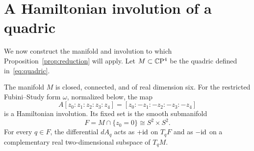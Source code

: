 \section{A Hamiltonian involution of a quadric}
\label{sec:quadric}

We now construct the manifold and involution to which
Proposition~\ref{prop:reduction} will apply.  Let $M\subset\mathbb C\mathrm P^4$ be the
quadric defined in~\eqref{eq:quadric}.

\begin{proposition}\label{prop:quadric}
The manifold $M$ is closed, connected, and of real dimension six. For
the restricted Fubini--Study form $\omega$, normalized below, the map
\[
 A[z_0:z_1:z_2:z_3:z_4]
   =[z_0:-z_1:-z_2:-z_3:-z_4]
\]
is a Hamiltonian involution.  Its fixed set is the smooth submanifold
\[
 F=M\cap\{z_0=0\}\cong S^2\times S^2.
\]
For every $q\in F$, the differential $dA_q$ acts as $+\mathrm{id}$ on $T_qF$
and as $-\mathrm{id}$ on a complementary real two-dimensional subspace of
$T_qM$.
\end{proposition}

